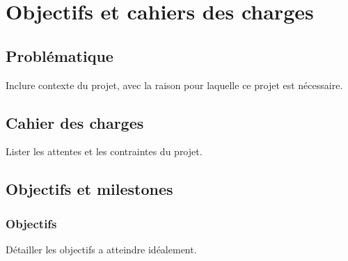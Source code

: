\documentclass[12pt]{report}
\begin{document}
\chapter{Objectifs et cahiers des charges}
	\section{Problématique} Inclure contexte du projet, avec la raison pour laquelle ce projet est nécessaire.
	
	
	 

	\section{Cahier des charges}
	Lister les attentes et les contraintes du projet.
	
	\section{Objectifs et milestones}
	
	\subsection{Objectifs} 
	Détailler les objectifs a atteindre idéalement.
	
\end{document}
